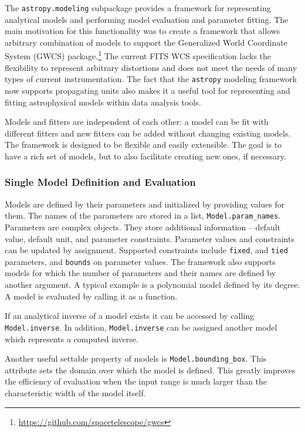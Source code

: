 \documentclass[modern]{aastex62}
\newcommand{\package}[1]{\texttt{#1}\xspace}
\newcommand{\astropypkg}{\package{astropy}}
\begin{document}
The \package{astropy.modeling} subpackage provides a framework for representing
analytical models and performing model evaluation and parameter fitting.
The main motivation for this functionality was to create a framework that
allows arbitrary combination of models to support the Generalized World
Coordinate System (GWCS) package.\footnote{\url{https://github.com/spacetelescope/gwcs}}
The current FITS WCS specification lacks the flexibility to represent
arbitrary distortions and does not meet the needs of many types of current instrumentation.
The fact that the \astropypkg modeling framework now supports propagating
units also makes it a useful tool for representing and fitting astrophysical
models within data analysis tools.

Models and fitters are independent of each other: a model can be fit with different
fitters and new fitters can be added without changing existing models. The
framework is designed to be flexible and easily extensible. The goal is to have
a rich set of models, but to also facilitate creating new ones, if necessary.

\subsubsection{Single Model Definition and Evaluation}

Models are defined by their parameters and initialized by providing values for them. The
names of the parameters are stored in a list, \texttt{Model.param\_names}. Parameters are complex objects.
They store additional information -- default value, default unit, and parameter constraints. Parameter
values and constraints can be updated by assignment. Supported constraints include \texttt{fixed},
and \texttt{tied} parameters, and \texttt{bounds} on parameter values. The framework also supports models
for which the number of parameters and their names are defined by another argument.
A typical example is a polynomial model defined by its degree.
A model is evaluated by calling it as a function.

If an analytical inverse of a model exists it can be
accessed  by calling \texttt{Model.inverse}. In addition, \texttt{Model.inverse} can be assigned
another model which represents a computed inverse.

Another useful settable property of models is \texttt{Model.bounding\_box}. This attribute sets the domain over which the model is defined. This greatly improves the efficiency of evaluation when the input range is much larger than the characteristic width of the model itself.
\end{document}
